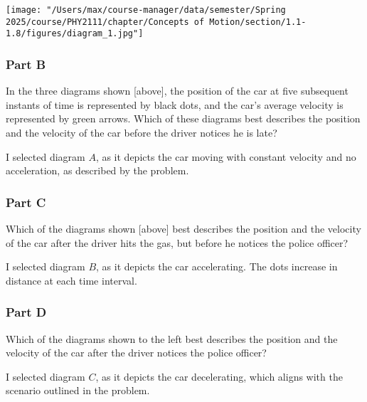 \begin{center}
	\texttt{[image: "/Users/max/course-manager/data/semester/Spring 2025/course/PHY2111/chapter/Concepts of Motion/section/1.1-1.8/figures/diagram\_1.jpg"]}
\end{center}

\subsubsection{Part B}
In the three diagrams shown [above], the position of the car at five subsequent instants of time is represented by black dots, and the car's average velocity is represented by green arrows. Which of these diagrams best describes the position and the velocity of the car before the driver notices he is late?

\vspace{1em}

\begin{solution}
	I selected diagram $A$, as it depicts the car moving with constant velocity and no acceleration, as described by the problem.
\end{solution}

\subsubsection{Part C}
Which of the diagrams shown [above] best describes the position and the velocity of the car after the driver hits the gas, but before he notices the police officer?

\vspace{1em}

\begin{solution}
	I selected diagram $B$, as it depicts the car accelerating. The dots increase in distance at each time interval.
\end{solution}

\subsubsection{Part D}
Which of the diagrams shown to the left best describes the position and the velocity of the car after the driver notices the police officer?

\vspace{1em}

\begin{solution}
	I selected diagram $C$, as it depicts the car decelerating, which aligns with the scenario outlined in the problem.
\end{solution}

